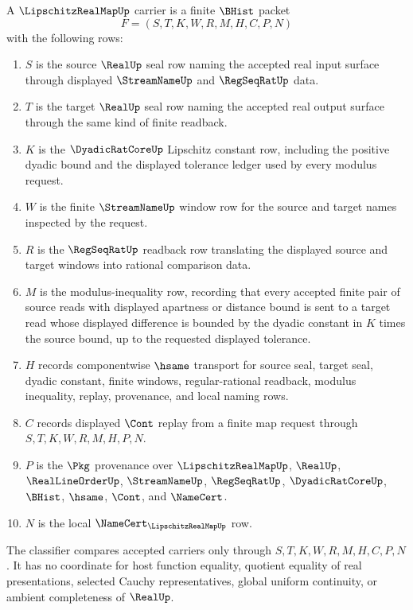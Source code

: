 \begin{definition}\label{def:lipschitz-real-map-carrier}
A $\LipschitzRealMapUp$ carrier is a finite $\BHist$ packet
$$
F=(S,T,K,W,R,M,H,C,P,N)
$$
with the following rows:
\begin{enumerate}
\item $S$ is the source $\RealUp$ seal row naming the accepted real input surface through displayed $\StreamNameUp$ and $\RegSeqRatUp$ data.
\item $T$ is the target $\RealUp$ seal row naming the accepted real output surface through the same kind of finite readback.
\item $K$ is the $\DyadicRatCoreUp$ Lipschitz constant row, including the positive dyadic bound and the displayed tolerance ledger used by every modulus request.
\item $W$ is the finite $\StreamNameUp$ window row for the source and target names inspected by the request.
\item $R$ is the $\RegSeqRatUp$ readback row translating the displayed source and target windows into rational comparison data.
\item $M$ is the modulus-inequality row, recording that every accepted finite pair of source reads with displayed apartness or distance bound is sent to a target read whose displayed difference is bounded by the dyadic constant in $K$ times the source bound, up to the requested displayed tolerance.
\item $H$ records componentwise $\hsame$ transport for source seal, target seal, dyadic constant, finite windows, regular-rational readback, modulus inequality, replay, provenance, and local naming rows.
\item $C$ records displayed $\Cont$ replay from a finite map request through $S,T,K,W,R,M,H,P,N$.
\item $P$ is the $\Pkg$ provenance over $\LipschitzRealMapUp$, $\RealUp$, $\RealLineOrderUp$, $\StreamNameUp$, $\RegSeqRatUp$, $\DyadicRatCoreUp$, $\BHist$, $\hsame$, $\Cont$, and $\NameCert$.
\item $N$ is the local $\NameCert_{\LipschitzRealMapUp}$ row.
\end{enumerate}
The classifier compares accepted carriers only through $S,T,K,W,R,M,H,C,P,N$. It has no coordinate for host function equality, quotient equality of real presentations, selected Cauchy representatives, global uniform continuity, or ambient completeness of $\RealUp$.
\end{definition}

